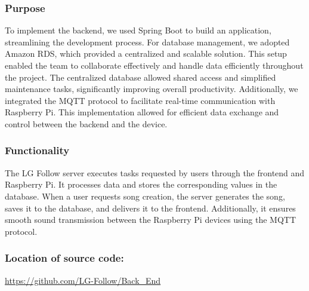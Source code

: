 \documentclass[conference]{IEEEtran}
\begin{document}
\subsubsection{Purpose}
\noindent To implement the backend, we used Spring Boot to build an application, streamlining the development process. For database management, we adopted Amazon RDS, which provided a centralized and scalable solution. This setup enabled the team to collaborate effectively and handle data efficiently throughout the project. The centralized database allowed shared access and simplified maintenance tasks, significantly improving overall productivity. Additionally, we integrated the MQTT protocol to facilitate real-time communication with Raspberry Pi. This implementation allowed for efficient data exchange and control between the backend and the device.\\

\subsubsection{Functionality}
\noindent The LG Follow server executes tasks requested by users through the frontend and Raspberry Pi. It processes data and stores the corresponding values in the database. When a user requests song creation, the server generates the song, saves it to the database, and delivers it to the frontend. Additionally, it ensures smooth sound transmission between the Raspberry Pi devices using the MQTT protocol.\\ 

\subsubsection{Location of source code: }
\url{https://github.com/LG-Follow/Back_End}\\

\clearpage
\end{document}

